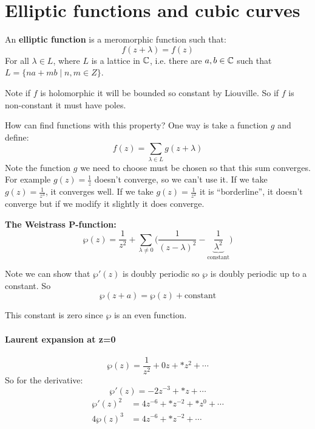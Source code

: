 \section{Elliptic functions and cubic curves}
\begin{definition}
    An \textbf{elliptic function} is a meromorphic function such that:\begin{equation*}
        f(z+\lambda) = f(z)
    \end{equation*}
    For all $\lambda\in L$, where $L$ is a lattice in $\mathbb{C}$, i.e. there are $a,b\in \mathbb{C}$ such that $L = \{na+mb \mid n,m\in Z\}$.

Note if $f$ is holomorphic it will be bounded so constant by Liouville. So if $f$ is non-constant it must have poles.
\end{definition}

How can find functions with this property? One way is take a function $g$ and define:\begin{equation*}
    f(z) = \sum_{\lambda\in L}g(z+\lambda)
\end{equation*}
Note the function $g$ we need to choose must be chosen so that this sum converges. For example $g(z) = \frac{1}{z}$ doesn't converge, so we can't use it. If we take $g(z) = \frac{1}{z^3}$, it converges well. If we take $g(z) = \frac{1}{z^2}$ it is ``borderline'', it doesn't converge but if we modify it slightly it does converge.

\begin{definition}
    \textbf{The Weistrass P-function:}\[\wp(z) = \frac{1}{z^2}+\sum_{\lambda\neq 0}\bigg(\frac{1}{{(z-\lambda)}^2}-\underbrace{\frac{1}{\lambda^2}}_{\text{constant}}\bigg) \]    
\end{definition}

Note we can show that $\wp'(z)$ is doubly periodic so $\wp$ is doubly periodic up to a constant. So \[\wp(z+a) = \wp(z)+\text{constant} \]

This constant is zero since $\wp$ is an even function.

\paragraph*{Laurent expansion at z=0}
\[\wp(z) = \frac{1}{z^2} + 0z+\ast z^2+\cdots\]
So for the derivative:\[\wp'(z) = -2z^{-3}+\ast z+\cdots\]
\begin{align*}
    {\wp'(z)}^2 &= 4z^{-6}+\ast z^{-2}+\ast z^0+\cdots\\
    4\wp(z)^3 &= 4z^{-6}+\ast z^{-2}+\cdots
\end{align*}


